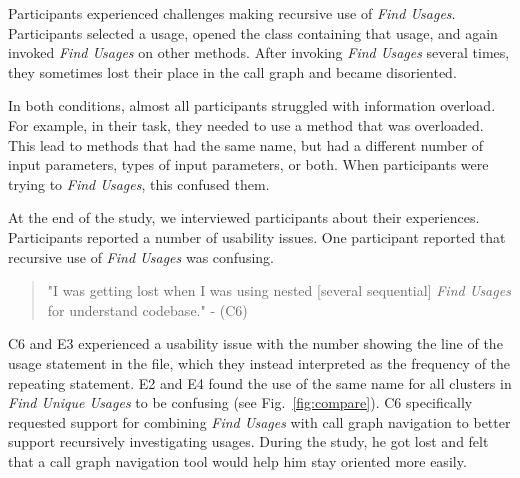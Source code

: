 \documentclass[conference]{IEEEtran}
\begin{document}
Participants experienced challenges making recursive use of \textit{Find Usages}. Participants selected a usage, opened the class containing that usage, and again invoked \textit{Find Usages} on other methods. After invoking \textit{Find Usages} several times, they sometimes lost their place in the call graph and became disoriented. \par

In both conditions, almost all participants struggled with information overload. For example, in their task, they needed to use a method that was overloaded. This lead to methods that had the same name, but had a different number of input parameters, types of input parameters, or both. When participants were trying to \textit{Find Usages}, this confused them.\par


At the end of the study, we interviewed  participants about their experiences. Participants reported a number of usability issues. One participant reported that recursive use of \textit{Find Usages} was confusing. 
\begin{quote} "I was getting lost when I was using nested [several sequential] \textit{Find Usages} for understand codebase." - (C6)\end{quote}
\noindent C6 and E3 experienced a usability issue with the number showing the line of the usage statement in the file, which they instead interpreted as the frequency of the repeating statement.
E2 and E4 found the use of the same name for all clusters in \textit{Find Unique Usages} to be confusing (see Fig.~\ref{fig:compare}). 
C6 specifically requested support for combining \textit{Find Usages} with call graph navigation to better support recursively investigating usages. During the study, he got lost and felt that a call graph navigation tool would help him stay oriented more easily.\par

\end{document}
